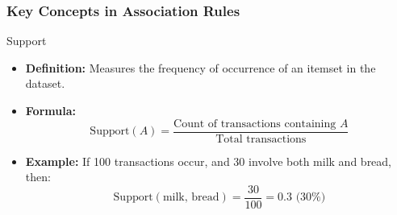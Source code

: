 \documentclass[aspectratio=169]{beamer}
\begin{document}
\begin{frame}[fragile]
    \frametitle{Key Concepts in Association Rules}
    \begin{block}{Support}
        \begin{itemize}
            \item \textbf{Definition:} Measures the frequency of occurrence of an itemset in the dataset.
            \item \textbf{Formula:}  
            \begin{equation}
                \text{Support}(A) = \frac{\text{Count of transactions containing } A}{\text{Total transactions}}
            \end{equation}
            \item \textbf{Example:} If 100 transactions occur, and 30 involve both milk and bread, then:
            \begin{equation}
                \text{Support}(\text{milk, bread}) = \frac{30}{100} = 0.3 \text{ (30\%)}
            \end{equation}
        \end{itemize}
    \end{block}
\end{frame}
\end{document}
